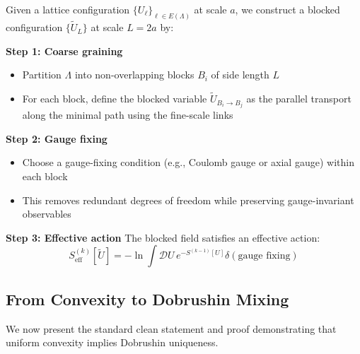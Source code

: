\begin{construction}
\label{const:block-spin}
Given a lattice configuration $\{U_\ell\}_{\ell \in E(\Lambda)}$ at scale $a$, we construct a blocked configuration $\{\widetilde{U}_L\}$ at scale $L = 2a$ by:

\textbf{Step 1: Coarse graining}
\begin{itemize}
\item Partition $\Lambda$ into non-overlapping blocks $B_i$ of side length $L$
\item For each block, define the blocked variable $\widetilde{U}_{B_i \to B_j}$ as the parallel transport along the minimal path using the fine-scale links
\end{itemize}

\textbf{Step 2: Gauge fixing}
\begin{itemize}
\item Choose a gauge-fixing condition (e.g., Coulomb gauge or axial gauge) within each block
\item This removes redundant degrees of freedom while preserving gauge-invariant observables
\end{itemize}

\textbf{Step 3: Effective action}
The blocked field satisfies an effective action:
\begin{equation}
S_{\text{eff}}^{(k)}[\widetilde{U}] = -\ln \int \mathcal{D}U \, e^{-S^{(k-1)}[U]} \delta(\text{gauge fixing})
\end{equation}
\end{construction}

\subsection{From Convexity to Dobrushin Mixing}

We now present the standard clean statement and proof demonstrating that uniform convexity implies Dobrushin uniqueness.

